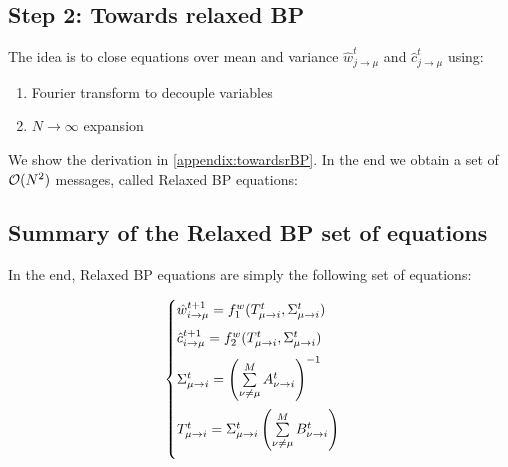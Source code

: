 \documentclass[aip,jmp,amsmath,amssymb,reprint]{revtex4}
\begin{document}
\subsection{Step 2: Towards relaxed BP}

The idea is to close equations over mean and variance $\hat{w}_{j\to \mu}^t$ and $\hat{c}_{j\to \mu}^t$ using:
\begin{enumerate}
	\item Fourier transform to decouple variables
	\item $N \to \infty$ expansion
\end{enumerate}

We show the derivation in \ref{appendix:towardsrBP}. In the end we obtain a set of $\mathcal{O}(N^2)$ messages, called Relaxed BP equations:

\subsection*{Summary of the Relaxed BP set of equations}
In the end, Relaxed BP equations are simply the following set of equations:\\
\begin{minipage}[c]{.46\linewidth}
\begin{equation}
	\begin{cases}
	\hat{w}_{i\to \mu}^{t+1} = f_1^w(T_{\mu \to i}^t,\Sigma_{\mu \to i}^t ) \vspace{0.2cm} \\
	\hat{c}_{i \to \mu}^{t+1} = f_2^w(T_{\mu \to i}^t, \Sigma_{\mu \to i}^t) \vspace{0.2cm} \\
	\Sigma_{\mu \to i}^t = \left( \sum\limits_{\nu \ne \mu}^M  A_{\nu \to i}^t \right )^{-1} \vspace{0.2cm} \\
	T_{\mu \to i}^t = \Sigma_{\mu \to i}^t  \left( \sum\limits_{\nu \ne \mu}^M  B_{\nu \to i}^t \right)\vspace{0.2cm} \\
	\end{cases}
	\label{supp:relaxed_BP}
\end{equation}
\end{minipage}
 \hfill
\end{document}
